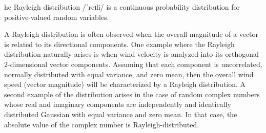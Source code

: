 he Rayleigh distribution /ˈreɪli/ is a continuous probability distribution for positive-valued random variables.

A Rayleigh distribution is often observed when the overall magnitude of a vector is related to its directional components. One example where the Rayleigh distribution naturally arises is when wind velocity is analyzed into its orthogonal 2-dimensional vector components. Assuming that each component is uncorrelated, normally distributed with equal variance, and zero mean, then the overall wind speed (vector magnitude) will be characterized by a Rayleigh distribution. A second example of the distribution arises in the case of random complex numbers whose real and imaginary components are independently and identically distributed Gaussian with equal variance and zero mean. In that case, the absolute value of the complex number is Rayleigh-distributed.
